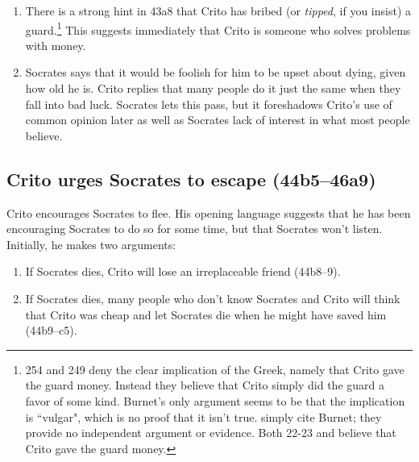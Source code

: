 \documentclass[12pt,letterpaper]{article}
\begin{document}
\begin{enumerate}

    \item There is a strong hint in 43a8 that Crito has bribed (or \emph{tipped}, if you insist) a guard.\footnote{\cite{burnet1924-euthyphro-apology-crito} 254 and \cite{brickhouse-smith2004-plato-trial-of-socrates} 249 deny the clear implication of the Greek, namely that Crito gave the guard money. Instead they believe that Crito simply did the guard a favor of some kind. Burnet's only argument seems to be that the implication is ``vulgar", which is no proof that it isn't true. \citeauthor{brickhouse-smith2004-plato-trial-of-socrates} simply cite Burnet; they provide no independent argument or evidence. Both \cite{adam1988-crito} 22-23 and \cite{rose1983} believe that Crito gave the guard money.} This suggests immediately that Crito is someone who solves problems with money.

    \item Socrates says that it would be foolish for him to be upset about dying, given how old he is. Crito replies that many people do it just the same when they fall into bad luck. Socrates lets this pass, but it foreshadows Crito's use of common opinion later as well as Socrates lack of interest in what most people believe.
\end{enumerate}


\subsection*{Crito urges Socrates to escape (44b5--46a9)}

Crito encourages Socrates to flee. His opening language suggests that he has been encouraging Socrates to do so for some time, but that Socrates won't listen. Initially, he makes two arguments:

\begin{enumerate}

    \item If Socrates dies, Crito will lose an irreplaceable friend
        (44b8--9).

    \item If Socrates dies, many people who don't know Socrates and Crito will think that Crito was cheap and let Socrates die when he might have saved him (44b9--c5).

\end{enumerate}
\end{document}
